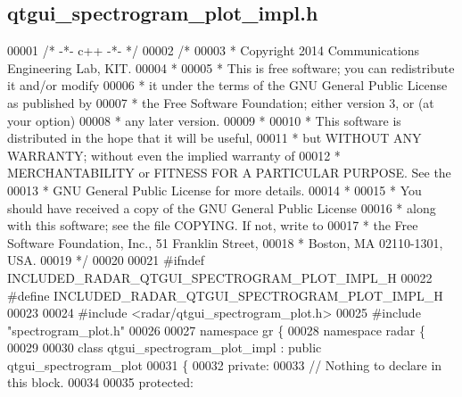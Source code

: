\subsection{qtgui\+\_\+spectrogram\+\_\+plot\+\_\+impl.\+h}
\label{qtgui__spectrogram__plot__impl_8h_source}

\begin{DoxyCode}
00001 \textcolor{comment}{/* -*- c++ -*- */}
00002 \textcolor{comment}{/* }
00003 \textcolor{comment}{ * Copyright 2014 Communications Engineering Lab, KIT.}
00004 \textcolor{comment}{ * }
00005 \textcolor{comment}{ * This is free software; you can redistribute it and/or modify}
00006 \textcolor{comment}{ * it under the terms of the GNU General Public License as published by}
00007 \textcolor{comment}{ * the Free Software Foundation; either version 3, or (at your option)}
00008 \textcolor{comment}{ * any later version.}
00009 \textcolor{comment}{ * }
00010 \textcolor{comment}{ * This software is distributed in the hope that it will be useful,}
00011 \textcolor{comment}{ * but WITHOUT ANY WARRANTY; without even the implied warranty of}
00012 \textcolor{comment}{ * MERCHANTABILITY or FITNESS FOR A PARTICULAR PURPOSE.  See the}
00013 \textcolor{comment}{ * GNU General Public License for more details.}
00014 \textcolor{comment}{ * }
00015 \textcolor{comment}{ * You should have received a copy of the GNU General Public License}
00016 \textcolor{comment}{ * along with this software; see the file COPYING.  If not, write to}
00017 \textcolor{comment}{ * the Free Software Foundation, Inc., 51 Franklin Street,}
00018 \textcolor{comment}{ * Boston, MA 02110-1301, USA.}
00019 \textcolor{comment}{ */}
00020 
00021 \textcolor{preprocessor}{#ifndef INCLUDED\_RADAR\_QTGUI\_SPECTROGRAM\_PLOT\_IMPL\_H}
00022 \textcolor{preprocessor}{#define INCLUDED\_RADAR\_QTGUI\_SPECTROGRAM\_PLOT\_IMPL\_H}
00023 
00024 \textcolor{preprocessor}{#include <radar/qtgui_spectrogram_plot.h>}
00025 \textcolor{preprocessor}{#include "spectrogram_plot.h"}
00026 
00027 \textcolor{keyword}{namespace }gr \{
00028   \textcolor{keyword}{namespace }radar \{
00029 
00030     \textcolor{keyword}{class }qtgui_spectrogram_plot_impl : \textcolor{keyword}{public} qtgui_spectrogram_plot
00031     \{
00032      \textcolor{keyword}{private}:
00033       \textcolor{comment}{// Nothing to declare in this block.}
00034 
00035      \textcolor{keyword}{protected}:

\end{DoxyCode}

